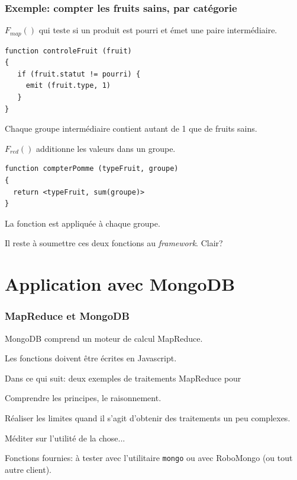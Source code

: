 \begin{frame}[fragile]
\frametitle{Exemple: compter les fruits sains, par catégorie}

$F_{map}()$ qui teste si un produit 
est pourri et \alert{émet} une paire intermédiaire.

\begin{verbatim}
function controleFruit (fruit)
{
   if (fruit.statut != pourri) {
     emit (fruit.type, 1)
   }
}
\end{verbatim}


Chaque groupe intermédiaire contient autant de 1 que de fruits sains.
\vfill

$F_{red}()$  additionne
les valeurs dans un groupe.

\begin{verbatim}
function compterPomme (typeFruit, groupe)
{
  return <typeFruit, sum(groupe)>
}
\end{verbatim}

La fonction est appliquée à \alert{chaque} groupe.

\smallskip

Il reste à soumettre ces deux fonctions au \textit{framework}. \alert{Clair?}

\end{frame}

\section{Application avec MongoDB}


\begin{frame}[fragile]
\frametitle{MapReduce et MongoDB}

MongoDB comprend un moteur de calcul MapReduce. 

\vfill


Les fonctions doivent être écrites en Javascript.

\vfill

Dans ce qui suit: deux exemples de traitements MapReduce pour

\begin{redbullet}
  \item Comprendre les principes, le raisonnement.
  \item Réaliser les limites quand il s'agit d'obtenir des traitements un peu complexes.
  \item Méditer sur l'utilité de la chose...
\end{redbullet}

Fonctions fournies: à tester avec l'utilitaire \texttt{mongo} ou avec RoboMongo (ou tout
autre client).
\end{frame}

